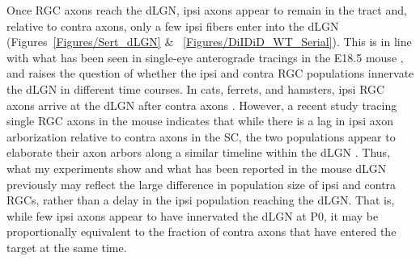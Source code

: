 Once RGC axons reach the dLGN, ipsi axons appear to remain in the tract and, relative to contra axons, only a few ipsi fibers enter into the dLGN (Figures~\ref{Figures/Sert_dLGN} \& ~\ref{Figures/DiIDiD_WT_Serial}).
This is in line with what has been seen in single-eye anterograde tracings in the E18.5 mouse \cite{godement1987study}, and raises the question of whether the ipsi and contra RGC populations innervate the dLGN in different time courses.
In cats, ferrets, and hamsters, ipsi RGC axons arrive at the dLGN after contra axons \cite{shatz1983prenatal,frost1979postnatal,linden1981dorsal}.
However, a recent study tracing single RGC axons in the mouse indicates that while there is a lag in ipsi axon arborization relative to contra axons in the SC, the two populations appear to elaborate their axon arbors along a similar timeline within the dLGN \cite{dhande2011development}.
Thus, what my experiments show and what has been reported in the mouse dLGN previously \cite{godement1987study} may reflect the large difference in population size of ipsi and contra RGCs, rather than a delay in the ipsi population reaching the dLGN.
That is, while few ipsi axons appear to have innervated the dLGN at P0, it may be proportionally equivalent to the fraction of contra axons that have entered the target at the same time.